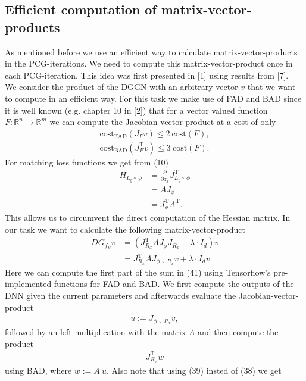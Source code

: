 \documentclass[conference]{IEEEtran}
\begin{document}
		\subsection{Efficient computation of matrix-vector-products}
	\noindent
	As mentioned before we use an efficient way to calculate matrix-vector-products in the PCG-iterations. We need to compute this matrix-vector-product once in each PCG-iteration. This idea was first presented in [1] using results from [7].\\ 
	We consider the product of the DGGN with an arbitrary vector $v$ that we want to compute in an efficient way.
	For this task we make use of FAD and BAD since it is well known (e.g. chapter 10 in [2]) that for a vector valued function $F:\mathbb{R}^{n}\rightarrow\mathbb{R}^{m}$ we can compute the Jacobian-vector-product at a cost of only
	\begin{align}
	\mathrm{cost}_{\text{FAD}}(J_{F}v)\leq 2\:\mathrm{cost}(F),\\
	\mathrm{cost}_{\text{BAD}}(J_{F}^{\mathrm{T}}v)\leq 3\:\mathrm{cost}(F).
	\end{align}
	For matching loss functions we get from (10)
	\begin{align}
	H_{L_{y}\circ\:\phi} &= \frac{\partial}{\partial z_{x}}J_{L_{y}\circ\:\phi}^{\mathrm{T}}\\
	&= AJ_{\phi} \\
	&= J_{\phi}^{\mathrm{T}}A^{\mathrm{T}}.
	\end{align}
	This allows us to circumvent the direct computation of the Hessian matrix. In our task we want to calculate the following matrix-vector-product
	\begin{align}
	DG_{f_{B}}v &=  \left(J_{R_{x}}^{\mathrm{T}}AJ_{\phi}J_{R_{x}} + \lambda\cdot I_{d}\right)v\\
	&= J_{R_{x}}^{\mathrm{T}}AJ_{\phi\:\circ\: R _{x}}v + \lambda\cdot I_{d}v.
	\end{align}
	Here we can compute the first part of the sum in (41) using Tensorflow's pre-implemented functions for FAD and BAD. We first compute the outputs of the DNN given the current parameters and afterwards evaluate the Jacobian-vector-product 
	\begin{align}
	u := J_{\phi\:\circ\: R _{x}}v,
	\end{align}
	followed by an left multiplication with the matrix $A$ and then compute the product 
	\begin{align}
	J_{R_{x}}^{\mathrm{T}}w
	\end{align}
	using BAD, where $w := A\:u$. Also note that using (39) insted of (38) we get 
\end{document}
